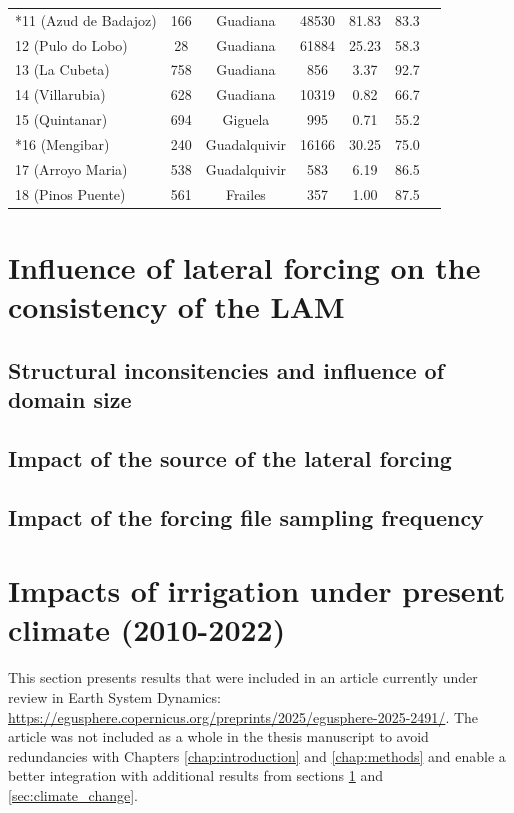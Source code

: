 \begin{table}[htbp]
{\begin{tabular}{lcccccc}
        *11 (Azud de Badajoz)   & 166   & Guadiana  & 48530     & 81.83  & 83.3 \\
        12 (Pulo do Lobo)       & 28    & Guadiana  & 61884     & 25.23  & 58.3 \\
        13 (La Cubeta)          & 758   & Guadiana  & 856       & 3.37   & 92.7 \\
        14 (Villarubia)         & 628   & Guadiana  & 10319     & 0.82   & 66.7 \\
        15 (Quintanar)          & 694   & Giguela   & 995       & 0.71   & 55.2 \\
        *16 (Mengibar)          & 240   & Guadalquivir & 16166  & 30.25  & 75.0 \\
        17 (Arroyo Maria)       & 538   & Guadalquivir & 583    & 6.19   & 86.5 \\
        18 (Pinos Puente)       & 561   & Frailes   & 357       & 1.00   & 87.5 \\
        \bottomrule
    \end{tabular}
    }
    \label{table:stations_data}
\end{table}
\clearpage

\section{Influence of lateral forcing on the consistency of the LAM}
\label{sec:forcing_influence}
\subsection{Structural inconsitencies and influence of domain size}
\subsection{Impact of the source of the lateral forcing}
\subsection{Impact of the forcing file sampling frequency}

\section{Impacts of irrigation under present climate (2010-2022)}
\label{sec:article1}
This section presents results that were included in an article currently under review in Earth System Dynamics: \url{https://egusphere.copernicus.org/preprints/2025/egusphere-2025-2491/}.
The article was not included as a whole in the thesis manuscript to avoid redundancies with Chapters \ref{chap:introduction} and \ref{chap:methods} and enable a better integration with additional results from sections \ref{sec:forcing_influence} and \ref{sec:climate_change}.

